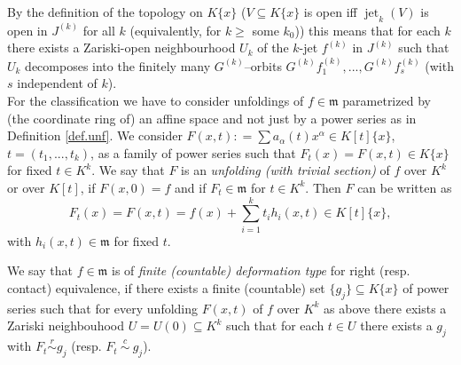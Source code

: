\documentclass[11pt]{article}
\DeclareMathOperator{\jet}{jet}
\newcommand{\fm}{\mathfrak{m}}
\begin{document}
By the definition of the topology on $K\{x\}$ ($V\subseteq K\{x\}$ is open iff  $\jet_k(V)$ is open in $ J^{(k)}$ for all $k$ (equivalently, for  $k\ge$ some $k_0$)) this means that for each $k$  there exists  a Zariski-open neighbourhood $U_k$ of the $k$-jet
$f^{(k)}$ in $J^{(k)}$ such that $U_k$ decomposes into the finitely many $G^{(k)}$--orbits $G^{(k)}f_1^{(k)},...,G^{(k)}f_s^{(k)}$ (with $s$ independent of $k$).\\


For the classification we have to consider unfoldings of $f\in \fm$ parametrized by (the coordinate ring of) an affine space and not  just by a power series as in Definition \ref{def.unf}.
We consider  $F(x,t) : = \sum a_\alpha(t) x^\alpha \in K[{t}]\{x\}$,
$t=(t_1,...,t_k)$, as a family of power series such that  $F_t(x) = F(x,t) \in K\{x\}$ for fixed $t\in K^k$. 
We say that $F$ is an {\em unfolding (with trivial section)} of $f$ over $K^k$ or over $K[t]$, if $F(x,0) =f$ and if $F_t \in \fm$ for $t\in K^k$. Then $F$ can be written as
$$F_{t}(x)=F(x,{t})=f(x)+\sum\limits^k_{i=1} t_ih_i(x,{t}) \in K[{t}]\{x\},$$
with $h_i(x,{t}) \in \fm$ for fixed $t$.

We say that $f\in \fm$ is of {\em finite (countable) deformation type}
for right (resp. contact) equivalence, if
there exists a finite (countable) set $\{g_j\}\subseteq K\{x\}$ of power series such that for every unfolding $F(x,t)$
of $f$ over $K^k$ as above
there exists a Zariski neighbouhood $U=U(0)\subseteq K^k$ such that for each ${t} \in U$ there exists a $g_j$ with $F_{t}\overset{r }{\sim} g_j$ (resp. $F_{t}\ \overset{c }{\sim} \ g_j$).
\end{document}
